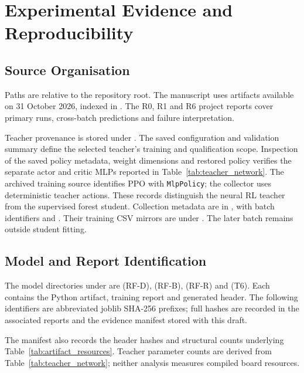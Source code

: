 \chapter{Experimental Evidence and Reproducibility}
\label{app:evidence}
\begingroup\raggedright
\section{Source Organisation}
\label{sec:evidence_sources}
Paths are relative to the repository root. The manuscript uses artifacts
available on 31 October 2026, indexed in
. The R0, R1 and R6 project
reports cover primary runs, cross-batch predictions and failure interpretation.

Teacher provenance is stored under
.
The saved configuration and validation summary define the selected teacher's
training and qualification scope. Inspection of the saved policy metadata,
weight dimensions and restored policy verifies the separate actor and critic
MLPs reported in Table~\ref{tab:teacher_network}. The archived training source
identifies PPO with \texttt{MlpPolicy}; the collector uses deterministic teacher
actions. These records distinguish the neural RL teacher from the supervised
forest student. Collection metadata are in
, with batch identifiers
 and
. Their training CSV mirrors are under
. The later batch remains outside student fitting.

\section{Model and Report Identification}
\label{sec:evidence_models}
The model directories under  are
 (RF-D),  (RF-B),
 (RF-R) and  (T6).
Each contains the Python artifact, training report and generated header.
The following identifiers are abbreviated joblib SHA-256 prefixes; full
hashes are recorded in the associated reports and the evidence manifest
stored with this draft.

The manifest also records the header hashes and structural counts underlying
Table~\ref{tab:artifact_resources}. Teacher parameter counts are derived from
Table~\ref{tab:teacher_network}; neither analysis measures compiled board resources.

